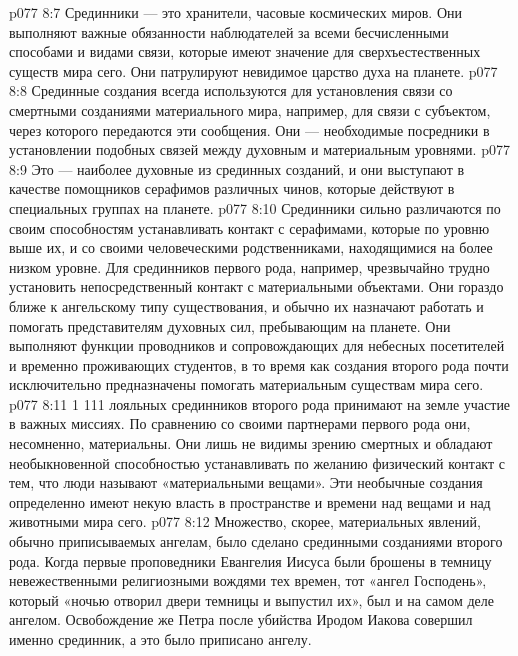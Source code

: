 \vs p077 8:7 \pc {}\bibnobreakspace {} Срединники --- это хранители, часовые космических миров. Они выполняют важные обязанности наблюдателей за всеми бесчисленными способами и видами связи, которые имеют значение для сверхъестественных существ мира сего. Они патрулируют невидимое царство духа на планете.
\vs p077 8:8 \pc {}\bibnobreakspace {} Срединные создания всегда используются для установления связи со смертными созданиями материального мира, например, для связи с субъектом, через которого передаются эти сообщения. Они --- необходимые посредники в установлении подобных связей между духовным и материальным уровнями.
\vs p077 8:9 \pc {}\bibnobreakspace {} Это --- наиболее духовные из срединных созданий, и они выступают в качестве помощников серафимов различных чинов, которые действуют в специальных группах на планете.
\vs p077 8:10 \pc Срединники сильно различаются по своим способностям устанавливать контакт с серафимами, которые по уровню выше их, и со своими человеческими родственниками, находящимися на более низком уровне. Для срединников первого рода, например, чрезвычайно трудно установить непосредственный контакт с материальными объектами. Они гораздо ближе к ангельскому типу существования, и обычно их назначают работать и помогать представителям духовных сил, пребывающим на планете. Они выполняют функции проводников и сопровождающих для небесных посетителей и временно проживающих студентов, в то время как создания второго рода почти исключительно предназначены помогать материальным существам мира сего.
\vs p077 8:11 1 111 лояльных срединников второго рода принимают на земле участие в важных миссиях. По сравнению со своими партнерами первого рода они, несомненно, материальны. Они лишь не видимы зрению смертных и обладают необыкновенной способностью устанавливать по желанию физический контакт с тем, что люди называют «материальными вещами». Эти необычные создания определенно имеют некую власть в пространстве и времени над вещами и над животными мира сего.
\vs p077 8:12 Множество, скорее, материальных явлений, обычно приписываемых ангелам, было сделано срединными созданиями второго рода. Когда первые проповедники Евангелия Иисуса были брошены в темницу невежественными религиозными вождями тех времен, тот «ангел Господень», который «ночью отворил двери темницы и выпустил их», был и на самом деле ангелом. Освобождение же Петра после убийства Иродом Иакова совершил именно срединник, а это было приписано ангелу.
